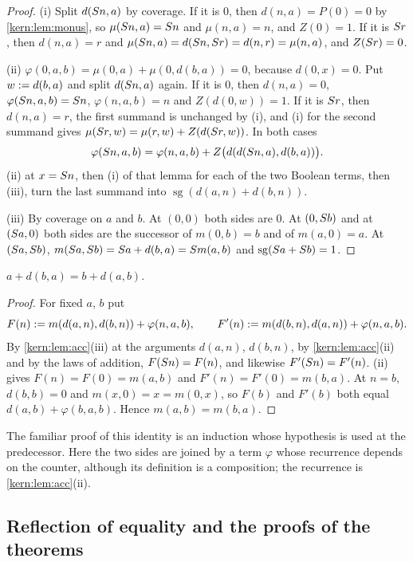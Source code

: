 \begin{proof}
(i) Split $d(S n,a)$ by coverage.  If it is $0$, then
$d(n,a)=P(0)=0$ by \cref{kern:lem:monus}, so $\mu(S n,a)=S n$ and
$\mu(n,a)=n$, and $Z(0)=1$.  If it is $S r$, then $d(n,a)=r$ and
$\mu(S n,a)=d(S n,S r)=d(n,r)=\mu(n,a)$, and $Z(S r)=0$.

(ii) $\varphi(0,a,b)=\mu(0,a)+\mu(0,d(b,a))=0$, because $d(0,x)=0$.  Put
$w\mathrel{:=} d(b,a)$ and split $d(S n,a)$ again.  If it is $0$, then
$d(n,a)=0$, $\varphi(S n,a,b)=S n$, $\varphi(n,a,b)=n$ and
$Z(d(0,w))=1$.  If it is $S r$, then $d(n,a)=r$, the first summand is
unchanged by (i), and (i) for the second summand gives
$\mu(S r,w)=\mu(r,w)+Z(d(S r,w))$.  In both cases
\[
 \varphi(S n,a,b)=\varphi(n,a,b)+Z\bigl(d(d(S n,a),d(b,a))\bigr).
\]
(ii) at $x=S n$, then (i) of that lemma for each of
the two Boolean terms, then (iii), turn the last summand into
$\operatorname{sg}(d(a,n)+d(b,n))$.

(iii) By coverage on $a$ and $b$.  At $(0,0)$ both sides are $0$.  At
$(0,S b)$ and at $(S a,0)$ both sides are the successor of
$m(0,b)=b$ and of $m(a,0)=a$.  At $(S a,S b)$,
$m(S a,S b)=S a+d(b,a)=S m(a,b)$ and
$\operatorname{sg}(S a+S b)=1$.
\end{proof}

\begin{lemma}
\label{kern:lem:max}
$a+d(b,a)=b+d(a,b)$.
\end{lemma}

\begin{proof}
For fixed $a$, $b$ put
\[
 F(n)\mathrel{:=} m(d(a,n),d(b,n))+\varphi(n,a,b),\qquad
 F'(n)\mathrel{:=} m(d(b,n),d(a,n))+\varphi(n,a,b).
\]
By \cref{kern:lem:acc}(iii) at the arguments $d(a,n)$, $d(b,n)$, by
\cref{kern:lem:acc}(ii) and by the laws of addition, $F(S n)=F(n)$, and
likewise $F'(S n)=F'(n)$.  (ii) gives
$F(n)=F(0)=m(a,b)$ and $F'(n)=F'(0)=m(b,a)$.  At $n=b$, $d(b,b)=0$ and
$m(x,0)=x=m(0,x)$, so $F(b)$ and $F'(b)$ both equal
$d(a,b)+\varphi(b,a,b)$.  Hence $m(a,b)=m(b,a)$.
\end{proof}

The familiar proof of this identity is an induction whose hypothesis is used
at the predecessor.  Here the two sides are joined by a term $\varphi$
whose recurrence depends on the counter, although its definition is a
composition; the recurrence is \cref{kern:lem:acc}(ii).

\subsection{Reflection of equality and the proofs of the theorems}
\label{kern:sec:urreflect}

